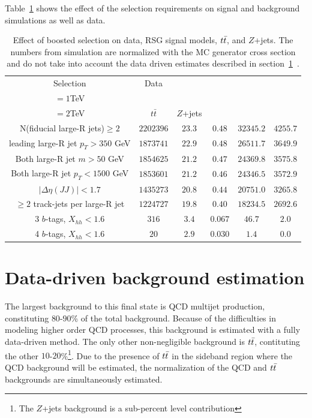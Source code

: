 Table~\ref{tab:4bcutflow} shows the effect of the selection requirements on signal and background simulations as well as data. 

\begin{table}[h!]
\centering
\captionsetup{justification=centering}

\hspace{-10pt}
\begin{tabular}{c|c|c|c|c|c}
Selection & Data & \specialcell{$m_{\Gkk}$ \\ $=1$TeV} & \specialcell{$m_{\Gkk}$\\ $=2$TeV} & $t\bar{t}$ & $Z$+jets \\
\hline
N(fiducial large-R jets)$\geq 2$ & $2202396$ & $23.3$ & $0.48$ & $32345.2$ & $4255.7$ \\
leading large-R jet $p_{T}>350$ GeV & $1873741$ & $22.9$ & $0.48$ & $26511.7$ & $3649.9$ \\
Both large-R jet $m>50$ GeV & $1854625$ & $21.2$ & $0.47$ & $24369.8$ & $3575.8$ \\
Both large-R jet $p_{T}<1500$ GeV & $1853601$ & $21.2$ & $0.46$ & $24346.5$ & $3572.9$ \\
$|\Delta\eta(JJ)|<1.7$ & $1435273$ & $20.8$ & $0.44$ & $20751.0$ & $3265.8$ \\
$\geq 2$ track-jets per large-R jet & $1224727$ & $19.8$ & $0.40$ & $18234.5$ & $2692.6$ \\
\hline
3 $b$-tags, $X_{hh}<1.6$ & $316$ & $3.4$ & $0.067$ & $46.7$ & $2.0$ \\
\hline
4 $b$-tags, $X_{hh}<1.6$ & $20$ & $2.9$ & $0.030$ & $1.4$ & $0.0$ \\
\hline
\end{tabular}

\caption{
Effect of boosted selection on data, RSG signal models, $t\bar{t}$, and $Z$+jets. The numbers from simulation are normalized with the MC generator cross section and do not take into account the data driven estimates described in section~\ref{sec:dd4b}~\cite{Qi}.
}
\label{tab:4bcutflow}
\end{table}

\section{Data-driven background estimation}
\label{sec:dd4b}

The largest background to this final state is QCD multijet production, constituting $80$-$90$\% of the total background. Because of the difficulties in modeling higher order QCD processes, this background is estimated with a fully data-driven method. The only other non-negligible background is $t\bar{t}$, contituting the other $10$-$20$\%\footnote{The $Z$+jets background is a sub-percent level contribution}.  Due to the presence of $t\bar{t}$ in the sideband region where the QCD background will be estimated, the normalization of the QCD and $t\bar{t}$ backgrounds are simultaneously estimated. 

